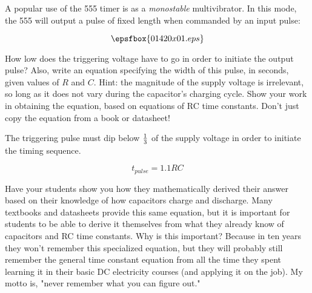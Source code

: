 

A popular use of the 555 timer is as a {\it monostable} multivibrator.  In this mode, the 555 will output a pulse of fixed length when commanded by an input pulse:

$$\epsfbox{01420x01.eps}$$

How low does the triggering voltage have to go in order to initiate the output pulse?  Also, write an equation specifying the width of this pulse, in seconds, given values of $R$ and $C$.  Hint: the magnitude of the supply voltage is irrelevant, so long as it does not vary during the capacitor's charging cycle.  Show your work in obtaining the equation, based on equations of RC time constants.  Don't just copy the equation from a book or datasheet!







The triggering pulse must dip below ${1 \over 3}$ of the supply voltage in order to initiate the timing sequence.

$$t_{pulse} = 1.1RC$$







Have your students show you how they mathematically derived their answer based on their knowledge of how capacitors charge and discharge.  Many textbooks and datasheets provide this same equation, but it is important for students to be able to derive it themselves from what they already know of capacitors and RC time constants.  Why is this important?  Because in ten years they won't remember this specialized equation, but they will probably still remember the general time constant equation from all the time they spent learning it in their basic DC electricity courses (and applying it on the job).  My motto is, "never remember what you can figure out."




